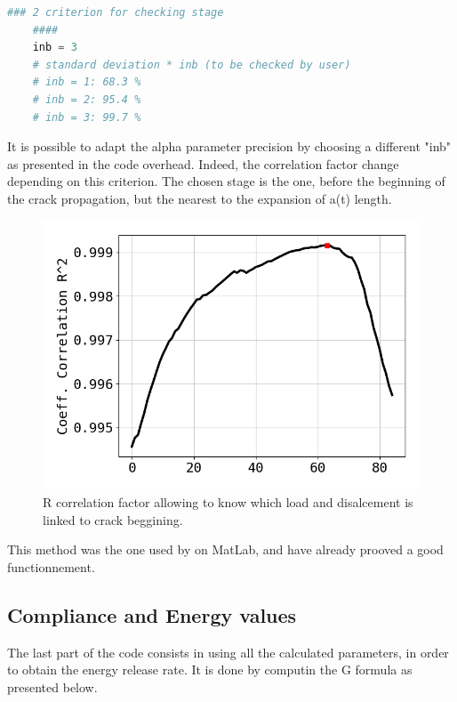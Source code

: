 \begin{lstlisting}[language=Python]
	### 2 criterion for checking stage
	####
	inb = 3
	# standard deviation * inb (to be checked by user)
	# inb = 1: 68.3 %
	# inb = 2: 95.4 %
	# inb = 3: 99.7 %
\end{lstlisting}

It is possible to adapt the alpha parameter precision by choosing a different "inb" as presented in the code overhead. Indeed, the correlation factor change depending on this criterion. The chosen stage is the one, before the beginning of the crack propagation, but the nearest to the expansion of a(t) length.

\begin{figure}[h]
	\centering
	\includegraphics[scale=0.3]{Figures/Correlation_factor}
	\decoRule
	\caption[R correlation factor]{R correlation factor allowing to know which load and disalcement is linked to crack beggining.}
	\label{fig:Fig12}
\end{figure}

This method was the one used by \parencite{Reference14} on MatLab, and have already prooved a good functionnement.

\subsection{Compliance and Energy values}

The last part of the code consists in using all the calculated parameters, in order to obtain the energy release rate. It is done by computin the G formula as presented below.

